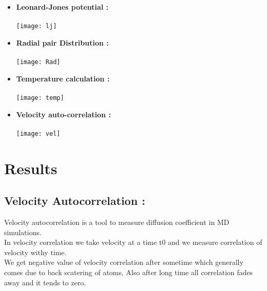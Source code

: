 \documentclass[11pt]{article}
\begin{document}
\begin{itemize}
	\item \textbf{Leonard-Jones potential :} \\
	\vspace{.1cm}\\
	\texttt{[image: lj]}
	\vspace{.1cm}
	\item \textbf{Radial pair Distribution :} \\
	\vspace{.1cm} \\
	\texttt{[image: Rad]} 
	\vspace{.1cm}
	\item \textbf{Temperature calculation :} \\
	\vspace{.1cm} \\
	\texttt{[image: temp]} 
	\vspace{.1cm}
	\item \textbf{Velocity auto-correlation :} \\
	\vspace{.1cm} \\
 	\texttt{[image: vel]}
	\vspace{.1cm}
	
\end{itemize}

\newpage

\section{Results}

\vspace{.5cm}

\subsection{Velocity Autocorrelation : }

Velocity autocorrelation is a tool to measure diffusion coefficient in MD simulations. \\
In velocity correlation we take velocity at a time t0 and we measure correlation of velocity withy time. \\
We get negative value of velocity correlation after sometime which generally comes due to back scatering of atoms, Also after long time all correlation fades away and it tends to zero.\\
\end{document}
